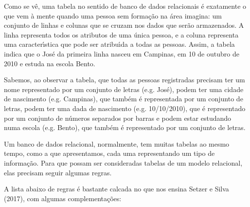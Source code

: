 \documentclass[
12pt,		%
openright,	%
twoside,  %
a4paper,			%
chapter=TITLE,		%
english,			%
french,				%
spanish,			%
brazil				%
]{USPSC-classe/USPSC}
\begin{document}
Como se v\^e, uma tabela no sentido de banco de dados relacionais \'e exatamente o que vem \`a mente quando uma pessoa sem forma\c{c}\~ao na \'area imagina: um conjunto de linhas e colunas que se cruzam nos dados que ser\~ao armazenados. A linha representa todos os atributos de uma \'unica pessoa, e a coluna representa uma caracter\'{\i}stica que pode ser atribu\'{\i}da a todas as pessoas. Assim, a tabela indica que o  Jos\'e da primeira linha nasceu em Campinas, em 10 de outubro de 2010 e estuda na escola Bento.









Sabemos, ao observar a tabela, que todas as pessoas registradas precisam ter um nome representado por um conjunto de letras (e.g. Jos\'e), podem ter uma cidade de nascimento (e.g. Campinas), que tamb\'em \'e representada por um conjunto de letras, podem ter uma dada de nascimento (e.g. 10/10/2010), que \'e representado por um conjunto de n\'umeros separados por barras e podem estar estudando numa escola (e.g. Bento), que tamb\'em \'e representado por um conjunto de letras.









Um banco de dados relacional, normalmente, tem muitas tabelas ao mesmo tempo, como a que apresentamos, cada uma representando um tipo de informa\c{c}\~ao. Para que possam ser consideradas tabelas de um modelo relacional, elas precisam seguir algumas regras.









A lista abaixo de regras \'e bastante calcada no que nos ensina  Setzer e Silva (2017), com algumas complementa\c{c}\~oes:
\end{document}
